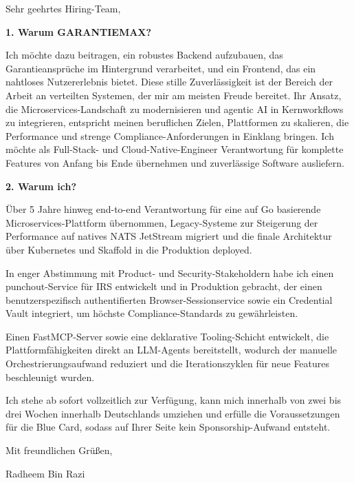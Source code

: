 \documentclass[11pt,a4paper]{coverletter}
\begin{document}

\opening{Sehr geehrtes Hiring-Team,}

\vspace{8pt}\noindent\textbf{1. Warum GARANTIEMAX?}\par\vspace{3pt}

Ich möchte dazu beitragen, ein robustes Backend aufzubauen, das Garantieansprüche im Hintergrund verarbeitet, und ein Frontend, das ein nahtloses Nutzererlebnis bietet. Diese stille Zuverlässigkeit ist der Bereich der Arbeit an verteilten Systemen, der mir am meisten Freude bereitet. Ihr Ansatz, die Microservices-Landschaft zu modernisieren und agentic AI in Kernworkflows zu integrieren, entspricht meinen beruflichen Zielen, Plattformen zu skalieren, die Performance und strenge Compliance-Anforderungen in Einklang bringen. Ich möchte als Full-Stack- und Cloud-Native-Engineer Verantwortung für komplette Features von Anfang bis Ende übernehmen und zuverlässige Software ausliefern.

\vspace{8pt}\noindent\textbf{2. Warum ich?}\par\vspace{3pt}

\bullets

  \item Über 5 Jahre hinweg end-to-end Verantwortung für eine auf Go basierende Microservices-Plattform übernommen, Legacy-Systeme zur Steigerung der Performance auf natives NATS JetStream migriert und die finale Architektur über Kubernetes und Skaffold in die Produktion deployed.

  \item In enger Abstimmung mit Product- und Security-Stakeholdern habe ich einen punchout-Service für IRS entwickelt und in Produktion gebracht, der einen benutzerspezifisch authentifierten Browser-Sessionservice sowie ein Credential Vault integriert, um höchste Compliance-Standards zu gewährleisten.

  \item Einen FastMCP-Server sowie eine deklarative Tooling-Schicht entwickelt, die Plattformfähigkeiten direkt an LLM-Agents bereitstellt, wodurch der manuelle Orchestrierungsaufwand reduziert und die Iterationszyklen für neue Features beschleunigt wurden.

\bulletsend

Ich stehe ab sofort vollzeitlich zur Verfügung, kann mich innerhalb von zwei bis drei Wochen innerhalb Deutschlands umziehen und erfülle die Voraussetzungen für die Blue Card, sodass auf Ihrer Seite kein Sponsorship-Aufwand entsteht.

\closing{Mit freundlichen Grüßen,}{Radheem Bin Razi}
\end{document}
